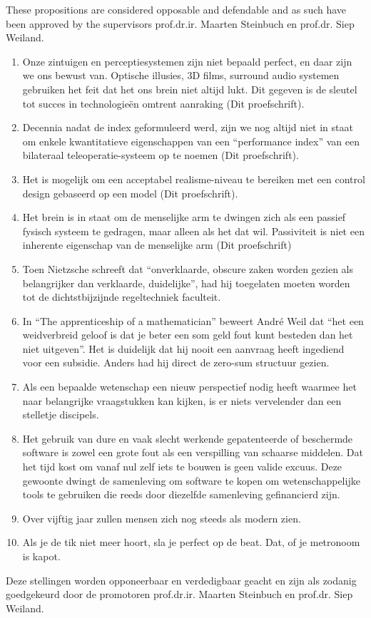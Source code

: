 \documentclass[10pt]{article}%
\newcommand{\mystelling}[1]{%
\item #1
}
\begin{document}
\vfill%

\noindent These propositions are considered opposable and defendable and as such have been approved by the supervisors 
prof.dr.ir. Maarten Steinbuch en prof.dr. Siep Weiland.
\newpage
%
%
\begin{enumerate}
\mystelling{Onze zintuigen en perceptiesystemen zijn niet bepaald perfect, en daar zijn we ons bewust van. Optische illusies, 3D films, 
surround audio systemen gebruiken het feit dat het ons brein niet altijd lukt. Dit gegeven is de sleutel tot succes in technologieën 
omtrent aanraking (Dit proefschrift).}
%
%
\mystelling{Decennia nadat de index geformuleerd werd, zijn we nog altijd niet in staat om enkele kwantitatieve eigenschappen van een 
\enquote{performance index} van een bilateraal teleoperatie-systeem op te noemen (Dit proefschrift).}
%
\mystelling{Het is mogelijk om een acceptabel realisme-niveau te bereiken met een control design gebaseerd op een model (Dit proefschrift).}
%
\mystelling{Het brein is in staat om de menselijke arm te dwingen zich als een passief fysisch systeem te gedragen, maar alleen als het 
dat wil. Passiviteit is niet een inherente eigenschap van de menselijke arm (Dit proefschrift)}
%
\mystelling{Toen Nietzsche schreeft dat \enquote{onverklaarde, obscure zaken worden gezien als belangrijker dan verklaarde, duidelijke}, 
had hij toegelaten moeten worden tot de dichtstbijzijnde regeltechniek faculteit.}
%
\mystelling{In \enquote{The apprenticeship of a mathematician} beweert André Weil dat \enquote{het een weidverbreid geloof is dat je beter 
een som geld fout kunt besteden dan het niet uitgeven}. Het is duidelijk dat hij nooit een aanvraag heeft ingediend voor een subsidie. 
Anders had hij direct de zero-sum structuur gezien.}
%
\mystelling{Als een bepaalde wetenschap een nieuw perspectief nodig heeft waarmee het naar belangrijke vraagstukken kan kijken, is er 
niets vervelender dan een stelletje discipels.}
%
\mystelling{Het gebruik van dure en vaak slecht werkende gepatenteerde of beschermde software is zowel een grote fout als een verspilling 
van schaarse middelen. Dat het tijd kost om vanaf nul zelf iets te bouwen is geen valide excuus. Deze gewoonte dwingt de samenleving om 
software te kopen om wetenschappelijke tools te gebruiken die reeds door diezelfde samenleving gefinancierd zijn.}
%
\mystelling{Over vijftig jaar zullen mensen zich nog steeds als modern zien.}
%
\mystelling{Als je de tik niet meer hoort, sla je perfect op de beat. Dat, of je metronoom is kapot.}
\end{enumerate}
\vfill
%
\noindent Deze stellingen worden opponeerbaar en verdedigbaar geacht en zijn als zodanig goedgekeurd door de promotoren 
prof.dr.ir. Maarten Steinbuch en prof.dr. Siep Weiland.
\end{document}
